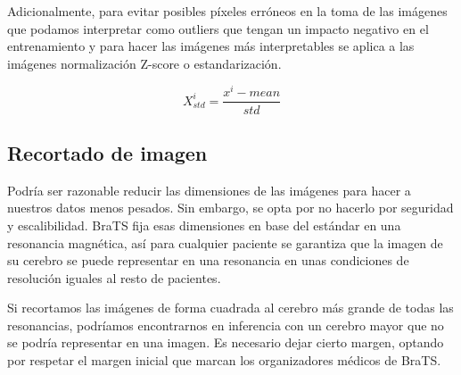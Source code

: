 Adicionalmente, para evitar posibles píxeles erróneos en la toma de las imágenes que podamos interpretar como outliers que tengan un impacto negativo en el entrenamiento y para hacer las imágenes más interpretables se aplica a las imágenes normalización Z-score o estandarización.

$$ X_{std}^{i}= \frac{x^{i}-mean}{std} $$



\subsection{Recortado de imagen}

Podría ser razonable reducir las dimensiones de las imágenes para hacer a nuestros datos menos pesados. Sin embargo, se opta por no hacerlo por seguridad y escalibilidad. BraTS fija esas dimensiones en base del estándar en una resonancia magnética, así para cualquier paciente se garantiza que la imagen de su cerebro se puede representar en una resonancia en unas condiciones de resolución iguales al resto de pacientes.

Si recortamos las imágenes de forma cuadrada al cerebro más grande de todas las resonancias, podríamos encontrarnos en inferencia con un cerebro mayor que no se podría representar en una imagen. Es necesario dejar cierto margen, optando por respetar el margen inicial que marcan los organizadores médicos de BraTS.

